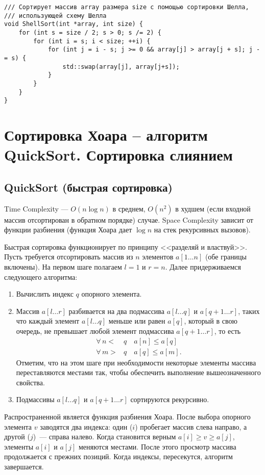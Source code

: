 \begin{verbatim}
/// Сортирует массив array размера size с помощью сортировки Шелла,
/// использующей схему Шелла
void ShellSort(int *array, int size) {
    for (int s = size / 2; s > 0; s /= 2) {
        for (int i = s; i < size; ++i) {
            for (int j = i - s; j >= 0 && array[j] > array[j + s]; j -= s) {
                std::swap(array[j], array[j+s]);
            }
        }
    }
}
\end{verbatim}

\section{Сортировка Хоара – алгоритм QuickSort. Сортировка слиянием}
\subsection{QuickSort (быстрая сортировка)}
Time Complexity --- $O(n\log n)$ в среднем, $O(n^2)$
в худшем (если входной массив отсортирован в обратном порядке) случае.
Space Complexity зависит от функции разбиения (функция Хоара дает $\log n$ на стек рекурсивных вызовов).

Быстрая сортировка функционирует по принципу <<разделяй и властвуй>>.
Пусть требуется отсортировать массив из $n$ элементов $a[1\dots n]$ (обе границы включены).
На первом шаге полагаем $l=1$ и $r=n$. Далее придерживаемся следующего алгоритма:
\begin{enumerate}
  \item Вычислить индекс $q$ опорного элемента.
  \item Массив $a[l\dots r]$
  разбивается на два подмассива $a[l\dots q]$ и $a[q+1\dots r]$, таких что каждый элемент $a[l\dots q]$
  меньше или равен $a[q]$, который в свою очередь, не превышает любой элемент подмассива $a[q+1\dots r]$, то есть
  \begin{align*}
    \forall\, n <&q \quad a[n] \leq a[q] \\
    \forall\, m >&q \quad a[q] \leq a[m].
  \end{align*}
  Отметим, что на этом шаге при необходимости некоторые элементы массива переставляются местами так,
  чтобы обеспечить выполнение вышеозначенного свойства.
  \item Подмассивы $a[l\dots q]$ и $a[q+1\dots r]$ сортируются рекурсивно.
\end{enumerate}

Распространенной является функция разбиения Хоара. После выбора опорного элемента $v$
заводятся два индекса: один ($i$) пробегает массив слева направо, а другой ($j$)~--- справа налево.
Когда становится верным $a[i] \geq v \geq a[j]$, элементы $a[i]$ и $a[j]$
меняются местами. После этого просмотр массива продолжается с прежних позиций. Когда индексы,
пересекутся, алгоритм завершается.

